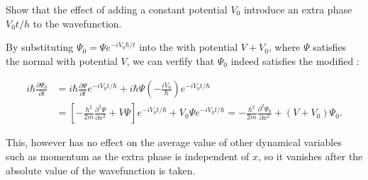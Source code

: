 \documentclass[a4paper,12pt]{report}
\begin{document}
{Show that the effect of adding a constant potential \(V_0\) introduce an extra phase \(V_0 t /h\) to the wavefunction.}
{By substituting \( \Psi_0 = \Psi e^{-i V_0 \hbar /t}\) into the \screq with potential \(V + V_0\), where \(\Psi\) satisfies the normal \screq with potential \(V\), we can verfify that \(\Psi_0\) indeed satisfies the modified \screq: 
			
\begin{equation}
	\begin{aligned}
		i \hbar \frac{\partial \Psi_0}{\partial t} & =i \hbar \frac{\partial \Psi}{\partial t} e^{-i V_0 t / \hbar}+i \hbar \Psi\left(-\frac{i V_0}{\hbar}\right) e^{-i V_0 t / \hbar} \\ &=\left[-\frac{\hbar^2}{2 m} \frac{\partial^2 \Psi}{\partial x^2}+V \Psi\right] e^{-i V_0 t / \hbar}+V_0 \Psi e^{-i V_0 t / \hbar} =-\frac{\hbar^2}{2 m} \frac{\partial^2 \Psi_0}{\partial x^2}+\left(V+V_0\right) \Psi_0 .
	\end{aligned}
\end{equation}
		
This, however has no effect on the average value of other dynamical variables such as momentum as the extra phase is independent of \(x\), so it vanishes after the absolute value of the wavefunction is taken.}
		
\end{document}
